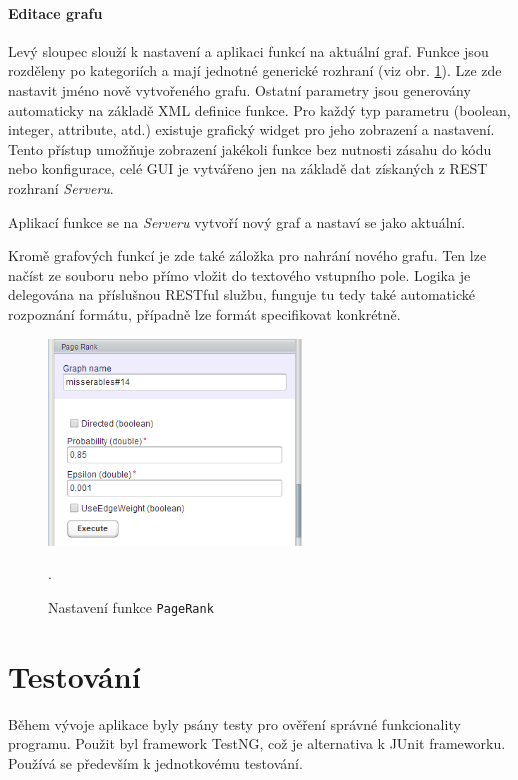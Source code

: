 \documentclass[thesis=M,czech]{FITthesis}[2014/05/6]
\begin{document}
\subsubsection{Editace grafu}
Levý sloupec slouží k nastavení a aplikaci funkcí na aktuální graf. Funkce jsou rozděleny po kategoriích a mají jednotné generické rozhraní (viz obr. \ref{fig:clientapp-pagerank}).
Lze zde nastavit jméno nově vytvořeného grafu. Ostatní parametry jsou generovány automaticky na základě XML definice funkce. Pro každý typ parametru (boolean, integer, attribute, atd.) existuje grafický widget pro jeho zobrazení
a nastavení. Tento přístup umožňuje zobrazení jakékoli funkce bez nutnosti zásahu do kódu nebo konfigurace, celé GUI je vytvářeno jen na základě dat získaných z REST rozhraní \textit{Serveru}. 

Aplikací funkce se na \textit{Serveru} vytvoří nový graf a nastaví se jako aktuální.

Kromě grafových funkcí je zde také záložka pro nahrání nového grafu. Ten lze načíst ze souboru nebo přímo vložit do textového vstupního pole. Logika je delegována na příslušnou RESTful službu,
funguje tu tedy také automatické rozpoznání formátu, případně lze formát specifikovat konkrétně.

\begin{figure}\centering
 	\includegraphics[width=0.6\textwidth]{images/prtsc/clientapp-pagerank}
 	\caption[Nastavení funkce \texttt{PageRank}]{Nastavení funkce \texttt{PageRank}}.\label{fig:clientapp-pagerank}
\end{figure}

\chapter{Testování}
Během vývoje aplikace byly psány testy pro ověření správné funkcionality
programu. Použit byl framework TestNG\cite{testng}, což je alternativa k JUnit
frameworku. Používá se především k jednotkovému testování.
\end{document}
